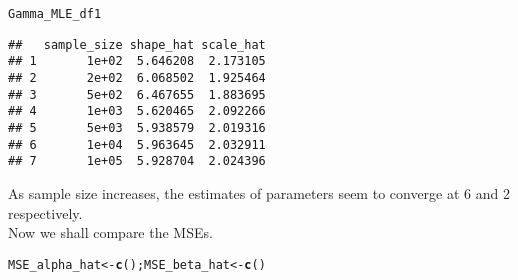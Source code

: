 \documentclass[11pt, a4paper]{article}\usepackage[]{graphicx}\usepackage[]{xcolor}
\makeatletter
\newcommand{\hldef}[1]{\textcolor[rgb]{0.345,0.345,0.345}{#1}}%
\newcommand{\hlkwb}[1]{\textcolor[rgb]{0.69,0.353,0.396}{#1}}%
\newcommand{\hlkwd}[1]{\textcolor[rgb]{0.737,0.353,0.396}{\textbf{#1}}}%
\newenvironment{kframe}{%
 \def\at@end@of@kframe{}%
 \ifinner\ifhmode%
  \def\at@end@of@kframe{\end{minipage}}%
  \begin{minipage}{\columnwidth}%
 \fi\fi%
 \def\FrameCommand##1{\hskip\@totalleftmargin \hskip-\fboxsep
 \colorbox{shadecolor}{##1}\hskip-\fboxsep
     \hskip-\linewidth \hskip-\@totalleftmargin \hskip\columnwidth}%
 \MakeFramed {\advance\hsize-\width
   \@totalleftmargin\z@ \linewidth\hsize
   \@setminipage}}%
 {\par\unskip\endMakeFramed%
 \at@end@of@kframe}
\newenvironment{knitrout}{}{} %
\makeatother
\begin{document}
\begin{knitrout}
\color{fgcolor}\begin{kframe}
\begin{alltt}
\hldef{Gamma_MLE_df1}
\end{alltt}
\begin{verbatim}
##   sample_size shape_hat scale_hat
## 1       1e+02  5.646208  2.173105
## 2       2e+02  6.068502  1.925464
## 3       5e+02  6.467655  1.883695
## 4       1e+03  5.620465  2.092266
## 5       5e+03  5.938579  2.019316
## 6       1e+04  5.963645  2.032911
## 7       1e+05  5.928704  2.024396
\end{verbatim}
\end{kframe}
\end{knitrout}

\smallpencil \hspace{0.1cm} {\setlength{\spaceskip}{1em plus 0.5em minus 0.5em} \fontsize{17}{20}\myfont As sample size increases, the estimates of parameters seem to converge at 6 and 2 respectively. \\

Now we shall compare the MSEs.
\par}




\begin{knitrout}
\color{fgcolor}\begin{kframe}
\begin{alltt}
\hldef{MSE_alpha_hat} \hlkwb{<-} \hlkwd{c}\hldef{(); MSE_beta_hat} \hlkwb{<-} \hlkwd{c}\hldef{()}
\end{alltt}
\end{kframe}
\end{knitrout}
\end{document}
